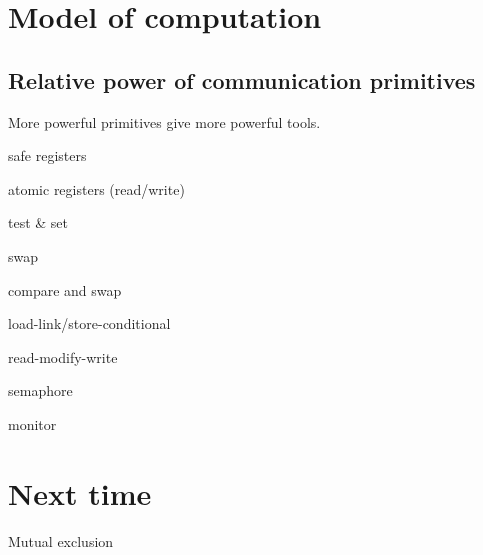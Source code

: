 \documentclass[a4paper]{article}
\newenvironment{itemize*}%
  {\begin{itemize}%
    \setlength{\itemsep}{0pt}%
    \setlength{\parsep}{0pt}%
    \setlength{\parskip}{0pt}}%
  {\end{itemize}}
\begin{document}
\section{Model of computation}

\subsection{Relative power of communication primitives}

More powerful primitives give more powerful tools.

\begin{itemize*}
  \item safe registers
  \item atomic registers (read/write)
  \item test \& set
  \item swap
  \item compare and swap
  \item load-link/store-conditional
  \item read-modify-write
  \item semaphore
  \item monitor
\end{itemize*}

\section{Next time}

Mutual exclusion
\end{document}
